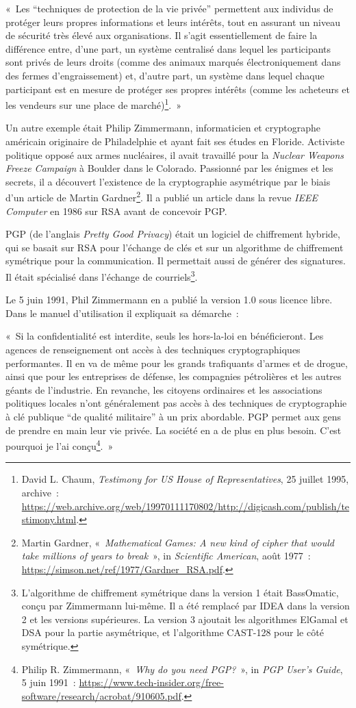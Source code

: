 \documentclass[
  a5paper,
  smalldemyvopaper,10pt,twoside,onecolumn,openright,extrafontsizes,hidelinks]{memoir}
\begin{document}
«~Les ``techniques de protection de la vie privée'' permettent aux
individus de protéger leurs propres informations et leurs intérêts, tout
en assurant un niveau de sécurité très élevé aux organisations. Il
s'agit essentiellement de faire la différence entre, d'une part, un
système centralisé dans lequel les participants sont privés de leurs
droits (comme des animaux marqués électroniquement dans des fermes
d'engraissement) et, d'autre part, un système dans lequel chaque
participant est en mesure de protéger ses propres intérêts (comme les
acheteurs et les vendeurs sur une place de marché)\footnote{David L.
  Chaum, \emph{Testimony for US House of Representatives}, 25 juillet
  1995, archive~:
  \url{https://web.archive.org/web/19970111170802/http://digicash.com/publish/testimony.html}.}.~»

Un autre exemple était Philip Zimmermann, informaticien et cryptographe
américain originaire de Philadelphie et ayant fait ses études en
Floride. Activiste politique opposé aux armes nucléaires, il avait
travaillé pour la \emph{Nuclear Weapons Freeze Campaign} à Boulder dans
le Colorado. Passionné par les énigmes et les secrets, il a découvert
l'existence de la cryptographie asymétrique par le biais d'un article de
Martin Gardner\footnote{Martin Gardner, «~\emph{Mathematical Games: A
  new kind of cipher that would take millions of years to break}~», in
  \emph{Scientific American}, août 1977~:
  \url{https://simson.net/ref/1977/Gardner_RSA.pdf}.}. Il a publié un
article dans la revue \emph{IEEE Computer} en 1986 sur RSA avant de
concevoir PGP.

PGP (de l'anglais \emph{Pretty Good Privacy}) était un logiciel de
chiffrement hybride, qui se basait sur RSA pour l'échange de clés et sur
un algorithme de chiffrement symétrique pour la communication. Il
permettait aussi de générer des signatures. Il était spécialisé dans
l'échange de courriels\footnote{L'algorithme de chiffrement symétrique
  dans la version 1 était BassOmatic, conçu par Zimmermann lui-même. Il
  a été remplacé par IDEA dans la version 2 et les versions supérieures.
  La version 3 ajoutait les algorithmes ElGamal et DSA pour la partie
  asymétrique, et l'algorithme CAST-128 pour le côté symétrique.}.

Le 5 juin 1991, Phil Zimmermann en a publié la version 1.0 sous licence
libre. Dans le manuel d'utilisation il expliquait sa démarche~:

«~Si la confidentialité est interdite, seuls les hors-la-loi en
bénéficieront. Les agences de renseignement ont accès à des techniques
cryptographiques performantes. Il en va de même pour les grands
trafiquants d'armes et de drogue, ainsi que pour les entreprises de
défense, les compagnies pétrolières et les autres géants de l'industrie.
En revanche, les citoyens ordinaires et les associations politiques
locales n'ont généralement pas accès à des techniques de cryptographie à
clé publique ``de qualité militaire'' à un prix abordable. PGP permet
aux gens de prendre en main leur vie privée. La société en a de plus en
plus besoin. C'est pourquoi je l'ai conçu\footnote{Philip R. Zimmermann,
  «~\emph{Why do you need PGP?}~», in \emph{PGP User's Guide}, 5 juin
  1991~:
  \url{https://www.tech-insider.org/free-software/research/acrobat/910605.pdf}.}.~»
\end{document}
